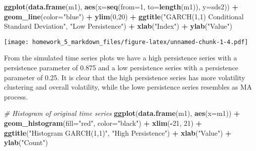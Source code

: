 \documentclass[]{article}
\newenvironment{Shaded}{\begin{snugshade}}{\end{snugshade}}
\newcommand{\KeywordTok}[1]{\textcolor[rgb]{0.13,0.29,0.53}{\textbf{#1}}}
\newcommand{\DataTypeTok}[1]{\textcolor[rgb]{0.13,0.29,0.53}{#1}}
\newcommand{\DecValTok}[1]{\textcolor[rgb]{0.00,0.00,0.81}{#1}}
\newcommand{\StringTok}[1]{\textcolor[rgb]{0.31,0.60,0.02}{#1}}
\newcommand{\CommentTok}[1]{\textcolor[rgb]{0.56,0.35,0.01}{\textit{#1}}}
\newcommand{\OperatorTok}[1]{\textcolor[rgb]{0.81,0.36,0.00}{\textbf{#1}}}
\newcommand{\NormalTok}[1]{#1}
\begin{document}
\begin{Shaded}
\begin{Highlighting}[]
\KeywordTok{ggplot}\NormalTok{(}\KeywordTok{data.frame}\NormalTok{(m1), }\KeywordTok{aes}\NormalTok{(}\DataTypeTok{x=}\KeywordTok{seq}\NormalTok{(}\DataTypeTok{from=}\DecValTok{1}\NormalTok{, }\DataTypeTok{to=}\KeywordTok{length}\NormalTok{(m1)), }\DataTypeTok{y=}\NormalTok{sds2)) }\OperatorTok{+}
\StringTok{  }\KeywordTok{geom_line}\NormalTok{(}\DataTypeTok{color=}\StringTok{"blue"}\NormalTok{) }\OperatorTok{+}
\StringTok{  }\KeywordTok{ylim}\NormalTok{(}\DecValTok{0}\NormalTok{,}\DecValTok{20}\NormalTok{) }\OperatorTok{+}
\StringTok{  }\KeywordTok{ggtitle}\NormalTok{(}\StringTok{"GARCH(1,1) Conditional Standard Deviation"}\NormalTok{, }\StringTok{"Low Persistence"}\NormalTok{) }\OperatorTok{+}
\StringTok{  }\KeywordTok{xlab}\NormalTok{(}\StringTok{"Index"}\NormalTok{) }\OperatorTok{+}
\StringTok{  }\KeywordTok{ylab}\NormalTok{(}\StringTok{"Value"}\NormalTok{)}
\end{Highlighting}
\end{Shaded}

\texttt{[image: homework\_5\_markdown\_files/figure-latex/unnamed-chunk-1-4.pdf]}

From the simulated time series plots we have a high persistence series
with a persistence parameter of 0.875 and a low persistence series with
a persistence parameter of 0.25. It is clear that the high persistence
series has more volatility clustering and overall volatility, while the
lowe persistence series resembles as MA process.

\begin{Shaded}
\begin{Highlighting}[]
\CommentTok{# Histogram of original time series}
\KeywordTok{ggplot}\NormalTok{(}\KeywordTok{data.frame}\NormalTok{(m1), }\KeywordTok{aes}\NormalTok{(}\DataTypeTok{x=}\NormalTok{m1)) }\OperatorTok{+}
\StringTok{  }\KeywordTok{geom_histogram}\NormalTok{(}\DataTypeTok{fill=}\StringTok{"red"}\NormalTok{, }\DataTypeTok{color=}\StringTok{"black"}\NormalTok{) }\OperatorTok{+}
\StringTok{  }\KeywordTok{xlim}\NormalTok{(}\OperatorTok{-}\DecValTok{21}\NormalTok{, }\DecValTok{21}\NormalTok{) }\OperatorTok{+}
\StringTok{  }\KeywordTok{ggtitle}\NormalTok{(}\StringTok{"Histogram GARCH(1,1)"}\NormalTok{, }\StringTok{"High Persistence"}\NormalTok{) }\OperatorTok{+}
\StringTok{  }\KeywordTok{xlab}\NormalTok{(}\StringTok{"Value"}\NormalTok{) }\OperatorTok{+}
\StringTok{  }\KeywordTok{ylab}\NormalTok{(}\StringTok{"Count"}\NormalTok{) }
\end{Highlighting}
\end{Shaded}
\end{document}
